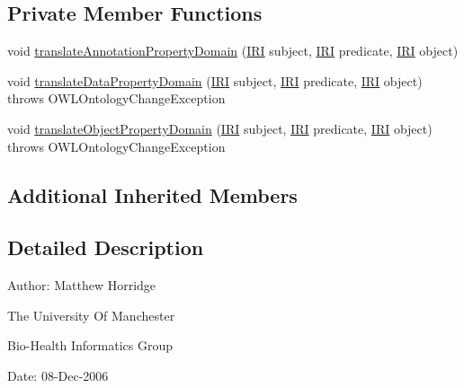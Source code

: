 \subsection*{Private Member Functions}
\begin{DoxyCompactItemize}
\item 
void \hyperlink{classorg_1_1coode_1_1owlapi_1_1rdfxml_1_1parser_1_1_t_p_property_domain_handler_ab9a568d38e5a983fb85ce302dd661a39}{translate\-Annotation\-Property\-Domain} (\hyperlink{classorg_1_1semanticweb_1_1owlapi_1_1model_1_1_i_r_i}{I\-R\-I} subject, \hyperlink{classorg_1_1semanticweb_1_1owlapi_1_1model_1_1_i_r_i}{I\-R\-I} predicate, \hyperlink{classorg_1_1semanticweb_1_1owlapi_1_1model_1_1_i_r_i}{I\-R\-I} object)
\item 
void \hyperlink{classorg_1_1coode_1_1owlapi_1_1rdfxml_1_1parser_1_1_t_p_property_domain_handler_af3173ee1677f093b191df65835593def}{translate\-Data\-Property\-Domain} (\hyperlink{classorg_1_1semanticweb_1_1owlapi_1_1model_1_1_i_r_i}{I\-R\-I} subject, \hyperlink{classorg_1_1semanticweb_1_1owlapi_1_1model_1_1_i_r_i}{I\-R\-I} predicate, \hyperlink{classorg_1_1semanticweb_1_1owlapi_1_1model_1_1_i_r_i}{I\-R\-I} object)  throws O\-W\-L\-Ontology\-Change\-Exception 
\item 
void \hyperlink{classorg_1_1coode_1_1owlapi_1_1rdfxml_1_1parser_1_1_t_p_property_domain_handler_ae1727812a34f1b3d7d5c544d7709ac91}{translate\-Object\-Property\-Domain} (\hyperlink{classorg_1_1semanticweb_1_1owlapi_1_1model_1_1_i_r_i}{I\-R\-I} subject, \hyperlink{classorg_1_1semanticweb_1_1owlapi_1_1model_1_1_i_r_i}{I\-R\-I} predicate, \hyperlink{classorg_1_1semanticweb_1_1owlapi_1_1model_1_1_i_r_i}{I\-R\-I} object)  throws O\-W\-L\-Ontology\-Change\-Exception 
\end{DoxyCompactItemize}
\subsection*{Additional Inherited Members}


\subsection{Detailed Description}
Author\-: Matthew Horridge\par
 The University Of Manchester\par
 Bio-\/\-Health Informatics Group\par
 Date\-: 08-\/\-Dec-\/2006\par
\par
 


